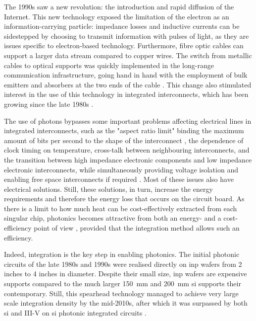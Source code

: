 The 1990s saw a new revolution: the introduction and rapid diffusion of the Internet. This new technology exposed the limitation of the electron as an information-carrying particle: impedance losses and inductive currents can be sidestepped by choosing to transmit information with pulses of light, as they are issues specific to electron-based technology. Furthermore, fibre optic cables can support a larger data stream compared to copper wires. The switch from metallic cables to optical supports was quickly implemented in the long-range communication infrastructure, going hand in hand with the employment of bulk emitters and absorbers at the two ends of the cable \cite{Schlereth1996}. This change also stimulated interest in the use of this technology in integrated interconnects, which has been growing since the late 1980s \cite{Miller1989}.

The use of photons bypasses some important problems affecting electrical lines in integrated interconnects, such as the "aspect ratio limit" binding the maximum amount of bits per second to the shape of the interconnect \cite{Miller1997}, the dependence of clock timing on temperature, cross-talk between neighbouring interconnects, and the transition between high impedance electronic components and low impedance electronic interconnects, while simultaneously providing voltage isolation and enabling free space interconnects if required \cite{Miller1997_reasons}. Most of these issues also have electrical solutions. Still, these solutions, in turn, increase the energy requirements and therefore the energy loss that occurs on the circuit board. As there is a limit to how much heat can be cost-effectively extracted from each singular chip, photonics becomes attractive from both an energy- and a cost-efficiency point of view \cite{Miller2009}, provided that the integration method allows such an efficiency. 

Indeed, integration is the key step in enabling photonics. The initial photonic circuits of the late 1980s and 1990s were realised directly on \acf{inp} wafers from \num{2} inches to \num{4} inches in diameter. Despite their small size, \acs{inp} wafers are expensive supports compared to the much larger \qty{150}{\milli\metre} and \qty{200}{\milli\metre} \acl{si} supports their contemporary. Still, this spearhead technology managed to achieve very large scale integration density by the mid-2010s, after which it was surpassed by both \acl{si} and III-V on \acl{si} photonic integrated circuits \cite{Shekhar2024, Margalit2021}.

